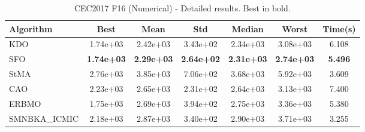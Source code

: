 \begin{table}[H]
\centering\small
\caption{CEC2017 F16 (Numerical) - Detailed results. Best in bold.}
\label{tab:cec2017_F16}
\begin{tabular}{lcccccc}
\toprule
\textbf{Algorithm} & \textbf{Best} & \textbf{Mean} & \textbf{Std} & \textbf{Median} & \textbf{Worst} & \textbf{Time(s)} \\
\midrule
KDO & 1.74e+03 & 2.42e+03 & 3.43e+02 & 2.34e+03 & 3.08e+03 & 6.108 \\
SFO & \textbf{1.74e+03} & \textbf{2.29e+03} & \textbf{2.64e+02} & \textbf{2.31e+03} & \textbf{2.74e+03} & \textbf{5.496} \\
StMA & 2.76e+03 & 3.85e+03 & 7.06e+02 & 3.68e+03 & 5.92e+03 & 3.609 \\
CAO & 2.23e+03 & 2.65e+03 & 2.31e+02 & 2.64e+03 & 3.13e+03 & 7.400 \\
ERBMO & 1.75e+03 & 2.69e+03 & 3.94e+02 & 2.75e+03 & 3.36e+03 & 5.380 \\
SMNBKA_ICMIC & 2.18e+03 & 2.87e+03 & 3.40e+02 & 2.90e+03 & 3.71e+03 & 3.255 \\
\bottomrule
\end{tabular}
\end{table}
